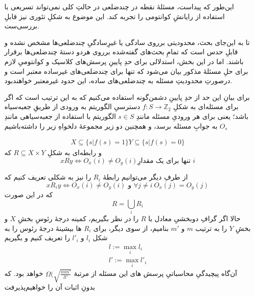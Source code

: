 
این‌طور که پیداست، مسئلهٔ نقطه در چندضلعی در حالتِ کلی نمی‌تواند تسریعی با استفاده از رایانشِ کوانتومی را تجربه کند. این موضوع به شکلِ تئوری نیز قابلِ بررسی‌ست.

تا به این‌جای بحث، محدودیتی برروی سادگی یا غیرِسادگیِ چندضلعی‌ها مشخص نشده و قابلِ حدس است که تمامِ بحث‌های گفته‌شده برروی هردو دستهٔ چندضلعی‌ها برقرار باشند. اما در این بخش، استدلالی برای حدِ پایینِ پرسش‌های کلاسیک و کوانتومیِ لازم برای حلِ مسئلهٔ مذکور بیان می‌شود که تنها برای چندضلعی‌های غیرساده معتبر است و درصورتِ محدودیتِ مسئله به چندضلعی‌های ساده، این حدود غیرمعتبر خواهندبود.

برای بیانِ این حد از حدِ پایینِ دشمن‌گونه استفاده می‌کنیم که به این ترتیب است که اگر برای مسئله‌ای به شکلِ
$f: S \to \mathbb{Z}_2$
دسترسیِ الگوریتم به ورودی از طریقِ جعبه‌سیاه باشد؛ یعنی برای هر ورودیِ مسئله مانندِ $s \in S$ الگوریتم با استفاده از جعبه‌سیاهی مانندِ
$O_s$
به جوابِ مسئله برسد، و همچنین دو زیر مجموعهٔ دلخواهِ زیر را داشته‌باشیم

\begin{eqnarray}
    X \subseteq \{ s | f(s) = 1 \}
    Y \subseteq \{ s | f(s) = 0 \}
\end{eqnarray}
و رابطه‌ای به شکلِ
$R \subseteq X \times Y $
که 
\begin{equation}
    x R y \Leftrightarrow O_x(i) \ne O_y(i) \text{تنها برای یک مقدارِ $i$}
\end{equation}

از طرفِ دیگر می‌توانیم رابطهٔ $R_i$ را نیز به شکلی تعریف کنیم که
\begin{equation}
    x R_i y \Leftrightarrow O_x(i) \ne O_y(i) \text{ و } \forall j \ne i ~ O_x(j) = O_y(j)
\end{equation}
که در این صورت
\begin{equation}
    R = \bigcup_{i} R_i
\end{equation}
حالا اگر گرافِ دوبخشیِ معادل با $R$ را در نظر بگیریم، کمینه درجهٔ رئوسِ بخشِ $X$ و بخشِ $Y$ را به ترتیب 
$m$
و 
$m'$
بنامیم، از سوی دیگر، برای $R_i$ ها بیشینهٔ  درجهٔ رئوس را به شکل $l_i$ و $l'_i$ را تعریف کنیم و بگیریم
\begin{eqnarray}
    l := \max_i l_i \\
    l':= \max_i l'_i
\end{eqnarray}
آن‌گاه پیچیدگیِ محاسباتیِ پرسش های این مسئله از مرتبهٔ
$\Omega(\sqrt{\frac{m m'}{l l'}}$
خواهد بود. که بدونِ اثبات آن را خواهیم‌پذیرفت  


